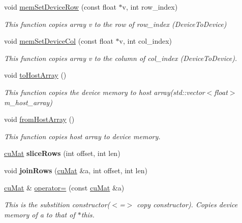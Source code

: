 \begin{DoxyCompactItemize}
void \mbox{\hyperlink{classcuMat_a7fe8fea4726b3f0a8c0112337eb5986b}{mem\+Set\+Device\+Row}} (const float $\ast$v, int row\+\_\+index)
\begin{DoxyCompactList}\small\item\em This function copies array v to the row of row\+\_\+index (Device\+To\+Device) \end{DoxyCompactList}\item 
void \mbox{\hyperlink{classcuMat_a2b11cfd9edbe5c5af48fca3361da036e}{mem\+Set\+Device\+Col}} (const float $\ast$v, int col\+\_\+index)
\begin{DoxyCompactList}\small\item\em This function copies array v to the column of col\+\_\+index (Device\+To\+Device). \end{DoxyCompactList}\item 
void \mbox{\hyperlink{classcuMat_a53d2015ea19cc77b0bc19f3b3251940a}{to\+Host\+Array}} ()
\begin{DoxyCompactList}\small\item\em This function copies the device memory to host array(std\+::vector$<$float$>$ m\+\_\+host\+\_\+array) \end{DoxyCompactList}\item 
\mbox{\label{classcuMat_ac3dc0a7af59174aa8b1411d47866d404}} 
void \mbox{\hyperlink{classcuMat_ac3dc0a7af59174aa8b1411d47866d404}{from\+Host\+Array}} ()
\begin{DoxyCompactList}\small\item\em This function copies host array to device memory. \end{DoxyCompactList}\item 
\mbox{\label{classcuMat_a3547edb6de42467f76764a35bcdecf76}} 
\mbox{\hyperlink{classcuMat}{cu\+Mat}} {\bfseries slice\+Rows} (int offset, int len)
\item 
\mbox{\label{classcuMat_abd39b0fe8f69f743775f760c97167c88}} 
void {\bfseries join\+Rows} (\mbox{\hyperlink{classcuMat}{cu\+Mat}} \&a, int offset, int len)
\item 
\mbox{\hyperlink{classcuMat}{cu\+Mat}} \& \mbox{\hyperlink{classcuMat_abbcf9b2dcc4062941b5f7727f4ac37fb}{operator=}} (const \mbox{\hyperlink{classcuMat}{cu\+Mat}} \&a)
\begin{DoxyCompactList}\small\item\em This is the substition constructor($<$=$>$ copy constructor). Copies device memory of a to that of $\ast$this. \end{DoxyCompactList}\item 

\end{DoxyCompactItemize}
